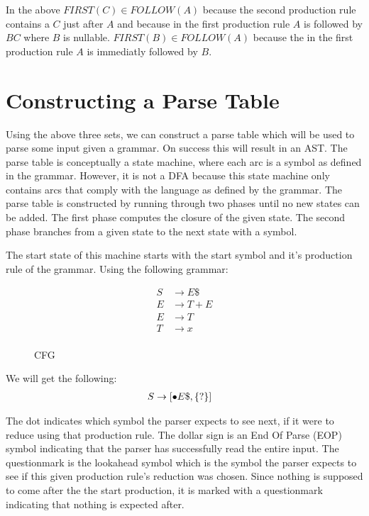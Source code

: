 In the above $FIRST(C) \in FOLLOW(A)$ because the second production rule contains a $C$ just after $A$ and because in the first production rule $A$ is followed by $BC$ where $B$ is nullable. $FIRST(B) \in FOLLOW(A)$ because the in the first production rule $A$ is immediatly followed by $B$.  

\section{Constructing a Parse Table}

Using the above three sets, we can construct a parse table which will be used to parse some input given a grammar. On success this will result in an AST. The parse table is conceptually a state machine, where each arc is a symbol as defined in the grammar. However, it is not a DFA because this state machine only contains arcs that comply with the language as defined by the grammar. The parse table is constructed by running through two phases until no new states can be added. The first phase computes the closure of the given state. The second phase branches from a given state to the next state with a symbol.

The start state of this machine starts with the start symbol and it's production rule of the grammar. Using the following grammar:

\begin{figure}[H]
  \begin{equation*}
    \begin{split}
        S &\rightarrow E\$\\
        E &\rightarrow T + E\\
        E &\rightarrow T\\
        T &\rightarrow x\\
    \end{split}
  \end{equation*}
  \caption{CFG}\label{cfgparser}
\end{figure}

We will get the following:
\begin{equation*}
  \begin{split}
      S &\rightarrow [\bullet E\text{\$}, \left\{?\right\}] 
  \end{split}
\end{equation*}

The dot indicates which symbol the parser expects to see next, if it were to reduce using that production rule. The dollar sign is an End Of Parse (EOP) symbol indicating that the parser has successfully read the entire input. The questionmark is the lookahead symbol which is the symbol the parser expects to see if this given production rule's reduction was chosen. Since nothing is supposed to come after the the start production, it is marked with a questionmark indicating that nothing is expected after. 

